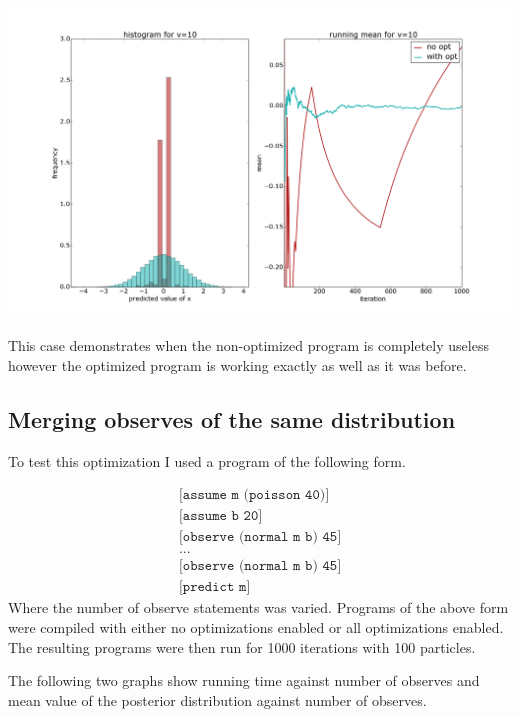 \documentclass[a4paper]{article}
\begin{document}
\centerline{\includegraphics[width=16cm]{images/pushing_samples_back_2.png}}

This case demonstrates when the non-optimized program is completely useless however the optimized program is working exactly as well as it was before.




\subsection{Merging observes of the same distribution}

To test this optimization I used a program of the following form.

\[
	\begin{array}{l}
		\texttt{[assume m (poisson 40)]} \\
		\texttt{[assume b 20]} \\
		\texttt{[observe (normal m b) 45]} \\
		\texttt{...} \\
		\texttt{[observe (normal m b) 45]} \\
		\texttt{[predict m]}
	\end{array}
\]
Where the number of observe statements was varied. Programs of the above form were compiled with either no optimizations enabled or all optimizations enabled. The resulting programs were then run for 1000 iterations with 100 particles.

The following two graphs show running time against number of observes and mean value of the posterior distribution against number of observes.
\end{document}
